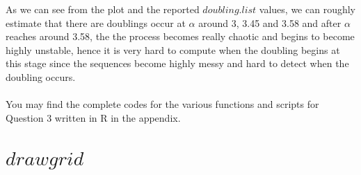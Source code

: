 \documentclass[12pt]{article}\usepackage[]{graphicx}\usepackage[]{color}
\begin{document}
As we can see from the plot and the reported $doubling.list$ values, we can roughly estimate that there are doublings occur at $\alpha$ around 3, 3.45 and 3.58 and after $\alpha$ reaches around 3.58, the the process becomes really chaotic and begins to become highly unstable, hence it is very hard to compute when the doubling begins at this stage since the sequences become highly messy and hard to detect when the doubling occurs.\\\\
You may find the complete codes for the various functions and scripts for Question 3 written in R in the appendix.


\newpage
\appendix


\section{$drawgrid$}
\end{document}
